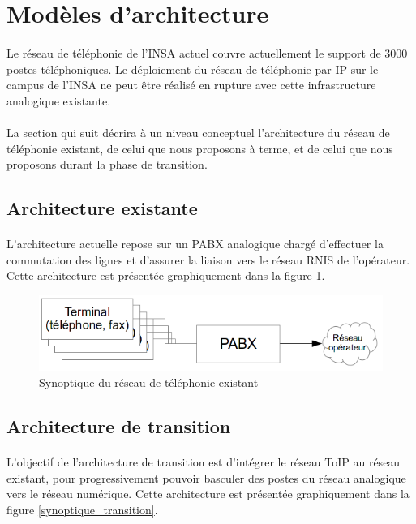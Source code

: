 \section{Modèles d'architecture}

\paragraph{} Le réseau de téléphonie de l'INSA actuel couvre actuellement le
support de 3000 postes téléphoniques. Le déploiement du réseau de téléphonie par
IP sur le campus de l'INSA ne peut être réalisé en rupture avec cette
infrastructure analogique existante.

\paragraph{} La section qui suit décrira à un niveau conceptuel l'architecture
du réseau de téléphonie existant, de celui que nous proposons à terme, et de
celui que nous proposons durant la phase de transition.

\subsection{Architecture existante}
\paragraph{} L'architecture actuelle repose sur un PABX analogique chargé
d'effectuer la commutation des lignes et d'assurer la liaison vers le réseau
\ac{RNIS} de l'opérateur. Cette architecture est présentée graphiquement dans la
figure \ref{synoptique_existant}.

\begin{figure}[h]
  \caption{\label{synoptique_existant} Synoptique du réseau de téléphonie
    existant}
  \includegraphics{Existant.png}
\end{figure}

\subsection{Architecture de transition}
\paragraph{} L'objectif de l'architecture de transition est d'intégrer
le réseau ToIP au réseau existant, pour progressivement pouvoir basculer des
postes du réseau analogique vers le réseau numérique. Cette architecture est
présentée graphiquement dans la figure \ref{synoptique_transition}.

